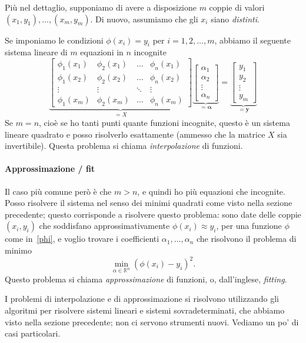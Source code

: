 \documentclass[a4paper]{report}
\theoremstyle{definiton}
\theoremstyle{remark}
\begin{document}
Più nel dettaglio, supponiamo di avere a disposizione $m$ coppie di valori $(x_1,y_1), \dots, (x_m,y_m)$. Di nuovo, assumiamo che gli $x_i$ siano \emph{distinti}.

Se imponiamo le condizioni $\phi(x_i) = y_i$ per $i=1,2,\dots, m$, abbiamo il seguente sistema lineare di $m$ equazioni in $n$ incognite
\[
\underbrace{
\begin{bmatrix}
    \phi_1(x_1) & \phi_2(x_1) & \dots & \phi_n(x_1)\\
    \phi_1(x_2) & \phi_2(x_2) & \dots & \phi_n(x_2)\\
    \vdots & \vdots & \ddots & \vdots\\
    \phi_1(x_m) & \phi_2(x_m) & \dots & \phi_n(x_m)
\end{bmatrix}}_{=X}
\underbrace{\begin{bmatrix}
    \alpha_1\\ \alpha_2 \\ \vdots \\ \alpha_n
\end{bmatrix}
}_{=\mathbf{\alpha}}
= \underbrace{\begin{bmatrix}
    y_1\\ y_2 \\ \vdots \\ y_m
\end{bmatrix}}_{=\mathbf{y}}
\]
Se $m=n$, cioè se ho tanti punti quante funzioni incognite, questo è un sistema lineare quadrato e posso risolverlo esattamente (ammesso che la matrice $X$ sia invertibile). Questa problema si chiama \emph{interpolazione} di funzioni. 

\paragraph{Approssimazione / fit} Il caso più comune però è che $m>n$, e quindi ho più equazioni che incognite. Posso risolvere il sistema nel senso dei minimi quadrati come visto nella sezione precedente; questo corrisponde a risolvere questo problema: sono date delle coppie $(x_i,y_i)$ che soddisfano approssimativamente $\phi(x_i) \approx y_i$, per una funzione $\phi$ come in~\eqref{phi}, e voglio trovare i coefficienti $\alpha_1,\dots,\alpha_n$ che risolvono il problema di minimo
\[
\min_{\alpha \in \mathbb{R}^n} (\phi(x_i) - y_i)^2.
\]
Questo problema si chiama \emph{approssimazione} di funzioni, o, dall'inglese, \emph{fitting}. 

I problemi di interpolazione e di approssimazione si risolvono utilizzando gli algoritmi per risolvere sistemi lineari e sistemi sovradeterminati, che abbiamo visto nella sezione precedente; non ci servono strumenti nuovi. Vediamo un po' di casi particolari.
\end{document}
